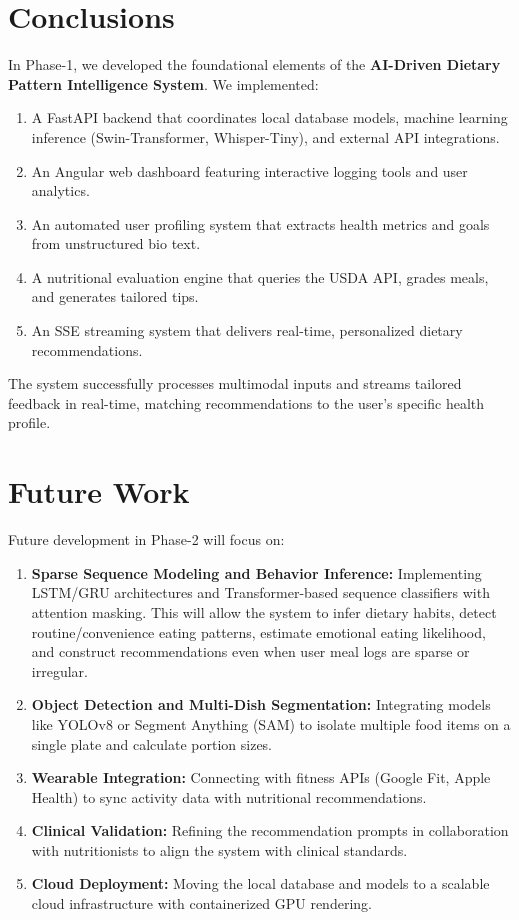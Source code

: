 \documentclass[12pt,a4paper,oneside]{report}
\begin{document}
\section{Conclusions}
In Phase-1, we developed the foundational elements of the \textbf{AI-Driven Dietary Pattern Intelligence System}. We implemented:
\begin{enumerate}
    \item A FastAPI backend that coordinates local database models, machine learning inference (Swin-Transformer, Whisper-Tiny), and external API integrations.
    \item An Angular web dashboard featuring interactive logging tools and user analytics.
    \item An automated user profiling system that extracts health metrics and goals from unstructured bio text.
    \item A nutritional evaluation engine that queries the USDA API, grades meals, and generates tailored tips.
    \item An SSE streaming system that delivers real-time, personalized dietary recommendations.
\end{enumerate}

The system successfully processes multimodal inputs and streams tailored feedback in real-time, matching recommendations to the user's specific health profile.

\section{Future Work}
Future development in Phase-2 will focus on:
\begin{enumerate}
    \item \textbf{Sparse Sequence Modeling and Behavior Inference:} Implementing LSTM/GRU architectures and Transformer-based sequence classifiers with attention masking. This will allow the system to infer dietary habits, detect routine/convenience eating patterns, estimate emotional eating likelihood, and construct recommendations even when user meal logs are sparse or irregular.
    \item \textbf{Object Detection and Multi-Dish Segmentation:} Integrating models like YOLOv8 or Segment Anything (SAM) to isolate multiple food items on a single plate and calculate portion sizes.
    \item \textbf{Wearable Integration:} Connecting with fitness APIs (Google Fit, Apple Health) to sync activity data with nutritional recommendations.
    \item \textbf{Clinical Validation:} Refining the recommendation prompts in collaboration with nutritionists to align the system with clinical standards.
    \item \textbf{Cloud Deployment:} Moving the local database and models to a scalable cloud infrastructure with containerized GPU rendering.
\end{enumerate}


\newpage


\end{document}
